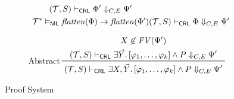 \begin{figure}
\begin{align*}
      { \prfStackPremises
        { (\mathcal{T}, S) \vdash_\CRL \Phi^\prime \Downarrow_{C, E} \Psi^\prime}
        { \mathcal{T}^* \vDash_\ML \mathit{flatten}(\Phi) \rightarrow \mathit{flatten}(\Phi^\prime) }
      }
      { (\mathcal{T}, S) \vdash_\CRL \Phi \Downarrow_{C, E} \Psi^\prime}
    \end{align*}

    
    \begin{align*}
    & \prftree[l]{Abstract}
      { \prfStackPremises
        { X \not\in \mathit{FV}(\Psi^\prime)
        }
        {(\mathcal{T}, S) \vdash_\CRL \exists \vec{Y}.\, [\varphi_1, \ldots, \varphi_k] \land P \Downarrow_{C, E} \Psi^\prime}
      }
      {(\mathcal{T}, S) \vdash_\CRL \exists X, \vec{Y}.\, [\varphi_1, \ldots, \varphi_k] \land P \Downarrow_{C, E} \Psi^\prime}
    \end{align*}
    \caption{Proof System}
    \label{fig:CRLproofsystem}
\end{figure}

